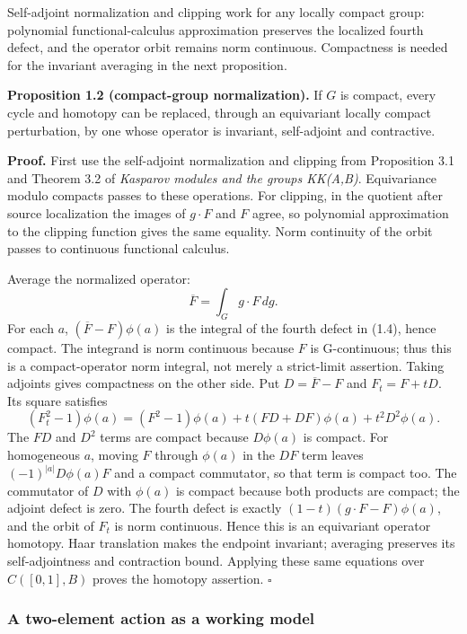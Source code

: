\documentclass[
  11pt,
]{article}
\begin{document}
Self-adjoint normalization and clipping work for any locally compact
group: polynomial functional-calculus approximation preserves the
localized fourth defect, and the operator orbit remains norm continuous.
Compactness is needed for the invariant averaging in the next
proposition.

\textbf{Proposition 1.2 (compact-group normalization).} If \(G\) is
compact, every cycle and homotopy can be replaced, through an
equivariant locally compact perturbation, by one whose operator is
invariant, self-adjoint and contractive.

\textbf{Proof.} First use the self-adjoint normalization and clipping
from Proposition 3.1 and Theorem 3.2 of \emph{Kasparov modules and the
groups KK(A,B)}. Equivariance modulo compacts passes to these
operations. For clipping, in the quotient after source localization the
images of \(g\cdot F\) and \(F\) agree, so polynomial approximation to
the clipping function gives the same equality. Norm continuity of the
orbit passes to continuous functional calculus.

Average the normalized operator: \[
\overline F=\int_G g\cdot F\,dg.
\tag{1.6}
\] For each \(a\), \((\overline F-F)\phi(a)\) is the integral of the
fourth defect in (1.4), hence compact. The integrand is norm continuous
because \(F\) is G-continuous; thus this is a compact-operator norm
integral, not merely a strict-limit assertion. Taking adjoints gives
compactness on the other side. Put \(D=\overline F-F\) and \(F_t=F+tD\).
Its square satisfies \[
(F_t^2-1)\phi(a)=(F^2-1)\phi(a)
 +t(FD+DF)\phi(a)+t^2D^2\phi(a).
\] The \(FD\) and \(D^2\) terms are compact because \(D\phi(a)\) is
compact. For homogeneous \(a\), moving \(F\) through \(\phi(a)\) in the
\(DF\) term leaves \((-1)^{|a|}D\phi(a)F\) and a compact commutator, so
that term is compact too. The commutator of \(D\) with \(\phi(a)\) is
compact because both products are compact; the adjoint defect is zero.
The fourth defect is exactly \((1-t)(g\cdot F-F)\phi(a)\), and the orbit
of \(F_t\) is norm continuous. Hence this is an equivariant operator
homotopy. Haar translation makes the endpoint invariant; averaging
preserves its self-adjointness and contraction bound. Applying these
same equations over \(C([0,1],B)\) proves the homotopy assertion.
\(\square\)

\subsubsection{A two-element action as a working
model}\label{a-two-element-action-as-a-working-model}
\end{document}
